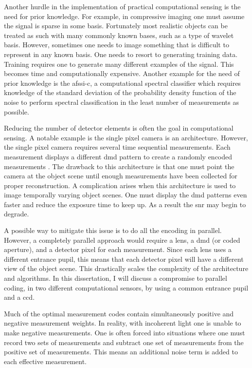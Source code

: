 Another hurdle in the implementation of practical computational sensing is the need for prior knowledge. For example, in \gls{compressive imaging} one must assume the signal is sparse in some basis. Fortunately most realistic objects can be treated as such with many commonly known bases, such as a type of wavelet basis. However, sometimes one needs to image something that is difficult to represent in any known basis. One needs to resort to generating training data.  Training requires one to generate many different examples of the signal. This becomes time and computationally expensive. Another example for the need of prior knowledge is the \gls{afssi-c}, a computational spectral classifier which requires knowledge of the standard deviation of the probability density function of the noise to perform spectral classification in the least number of measurements as possible.

Reducing the number of detector elements is often the goal in computational sensing. A notable example is the single pixel camera is an architecture. However, the single pixel camera requires several time sequential measurements. Each measurement displays a different \gls{dmd} pattern to create a randomly encoded measurements \cite{duarte2008single}. The drawback to this architecture is that one must point the camera at the object scene until enough measurements have been collected for proper reconstruction. A complication arises when this architecture is used to image temporally varying object scenes. One must display the \gls{dmd} patterns even faster and reduce the exposure time to keep up. As a result the \gls{snr} may begin to degrade. 

A possible way to mitigate this issue is to do all the encoding in parallel. However, a completely parallel approach would require a lens, a \gls{dmd} (or coded aperture), and a detector pixel for each measurement. Since each lens uses a different entrance pupil, this means that each detector pixel will have a different view of the object scene. This drastically scales the complexity of the architecture and algorithms. In this dissertation, I will discuss a compromise to parallel coding, in two different computational sensors, by using a common entrance pupil and a \gls{ccd}.

Much of the optimal measurement codes contain simultaneously positive and negative measurement weights. In reality, with incoherent light one is unable to make negative measurements. One is often forced into situations where one must record two sets of measurements and subtract one set of measurements from the positive set of measurements. This means an additional noise term is added to each effective measurement. 

